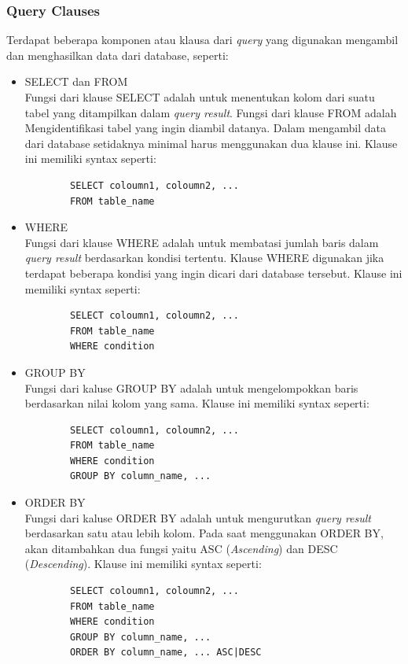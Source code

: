 \subsubsection{Query Clauses}
Terdapat beberapa komponen atau klausa dari \textit{query} yang digunakan mengambil dan menghasilkan data dari database, seperti:
\begin{itemize}
	\item SELECT dan FROM\\
	Fungsi dari klause SELECT adalah untuk menentukan kolom dari suatu tabel yang ditampilkan dalam \textit{query result}. Fungsi dari klause FROM adalah Mengidentifikasi tabel yang ingin diambil datanya. Dalam mengambil data dari database setidaknya minimal harus menggunakan dua klause ini. Klause ini memiliki syntax seperti:
	\begin{verbatim}
		SELECT coloumn1, coloumn2, ...
		FROM table_name
	\end{verbatim}
	
	\item WHERE\\
	Fungsi dari klause WHERE adalah untuk membatasi jumlah baris dalam \textit{query result} berdasarkan kondisi tertentu. Klause WHERE digunakan jika terdapat beberapa kondisi yang ingin dicari dari database tersebut. Klause ini memiliki syntax seperti:
	\begin{verbatim}
		SELECT coloumn1, coloumn2, ...
		FROM table_name
		WHERE condition
	\end{verbatim}
	
	\item GROUP BY\\
	Fungsi dari kaluse GROUP BY adalah untuk mengelompokkan baris berdasarkan nilai kolom yang sama. Klause ini memiliki syntax seperti:
	\begin{verbatim}
		SELECT coloumn1, coloumn2, ...
		FROM table_name
		WHERE condition
		GROUP BY column_name, ...
	\end{verbatim}
	
	\item ORDER BY\\
	Fungsi dari kaluse ORDER BY adalah untuk mengurutkan \textit{query result} berdasarkan satu atau lebih kolom. Pada saat menggunakan ORDER BY, akan ditambahkan dua fungsi yaitu ASC (\textit{Ascending}) dan DESC (\textit{Descending}). Klause ini memiliki syntax seperti:
	\begin{verbatim}
		SELECT coloumn1, coloumn2, ...
		FROM table_name
		WHERE condition
		GROUP BY column_name, ...
		ORDER BY column_name, ... ASC|DESC
	\end{verbatim}
\end{itemize}



